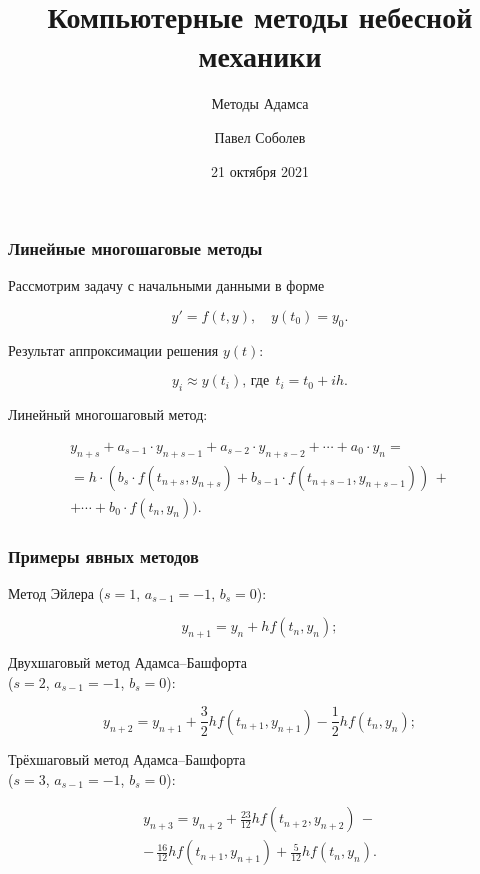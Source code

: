


\title{Компьютерные методы небесной механики}
\subtitle{Методы Адамса}
\author{Павел Соболев}
\date{21 октября 2021}



\frame{\titlepage}

\begin{frame}
\frametitle{Линейные многошаговые методы}
Рассмотрим задачу с начальными данными в форме

\su
\begin{equation}
  y' = f(t, y), \quad y(t_0) = y_0.
\end{equation}

Результат аппроксимации решения $ y(t) $:

\su
\begin{equation}
  y_i \approx y(t_i), \, \text{где} \;\, t_i = t_0 + ih.
\end{equation}

Линейный многошаговый метод:

\su
\begin{equation}
\begin{gathered}
  y_{n+s} + a_{s-1} \cdot y_{n+s-1} + a_{s-2} \cdot y_{n+s-2} + \cdots + a_0 \cdot y_n = \\
  = h \cdot (b_s \cdot f(t_{n+s}, y_{n+s}) + b_{s-1} \cdot f(t_{n+s-1}, y_{n+s-1})) \, + \\
  + \cdots + b_0 \cdot f(t_n, y_n)).
\end{gathered}
\end{equation}

\end{frame}

\begin{frame}
\frametitle{Примеры явных методов}

Метод Эйлера ($s = 1$, $a_{s-1} = -1$, $b_s = 0$):

\su
\begin{equation}
  y_{n+1} = y_n + h f(t_n, y_n);
\end{equation}

Двухшаговый метод Адамса--Башфорта \\
($s = 2$, $a_{s-1} = -1$, $b_s = 0$):

\su
\begin{equation}
  y_{n+2} = y_{n+1} + \frac{3}{2} h f(t_{n+1}, y_{n+1}) - \frac{1}{2} h f(t_n, y_n);
\end{equation}

Трёхшаговый метод Адамса--Башфорта \\
($s = 3$, $a_{s-1} = -1$, $b_s = 0$):

\su
\begin{equation}
\begin{gathered}
  y_{n+3} = y_{n+2} + \frac{23}{12} h f(t_{n+2}, y_{n+2}) \, - \\
  - \, \frac{16}{12} h f(t_{n+1}, y_{n+1}) + \frac{5}{12} h f(t_n, y_n).
\end{gathered}
\end{equation}

\end{frame}

